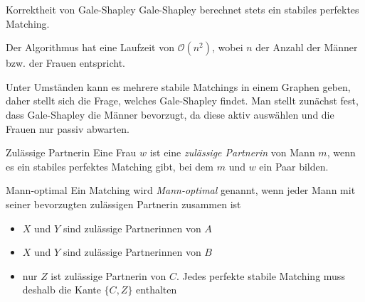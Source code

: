 \documentclass{panikzettel}
\begin{document}
\begin{theo}{Korrektheit von Gale-Shapley}
	Gale-Shapley berechnet stets ein stabiles perfektes Matching. 
	
	Der Algorithmus hat eine Laufzeit von $\mathcal{O}(n^2)$, wobei $n$ der Anzahl der Männer bzw. der Frauen entspricht.
\end{theo}

Unter Umständen kann es mehrere stabile Matchings in einem Graphen geben, daher stellt sich die Frage, welches Gale-Shapley findet. Man stellt zunächst fest, dass Gale-Shapley die Männer bevorzugt, da diese aktiv auswählen und die Frauen nur passiv abwarten. 

\begin{thirdboxl}
	\vspace{-\baselineskip}	
	\begin{defi}{Zulässige Partnerin}
		Eine Frau $w$ ist eine \emph{zulässige Partnerin} von Mann $m$, wenn es ein stabiles perfektes Matching gibt, bei dem $m$ und $w$ ein Paar bilden.
	\end{defi}

	\begin{defi}{Mann-optimal}
		Ein Matching wird \emph{Mann-optimal} genannt, wenn jeder Mann mit seiner bevorzugten zulässigen Partnerin zusammen ist
	\end{defi}
\end{thirdboxl}%
\begin{thirdboxm}
	\vspace{0.7cm}	
	\begin{center}
	\end{center}
\end{thirdboxm}%
\begin{thirdboxr}
	\vspace{1.5cm}	
	\begin{itemize}
		\item $X$ und $Y$ sind zulässige Partnerinnen von $A$
		\item $X$ und $Y$ sind zulässige Partnerinnen von $B$
		\item nur $Z$ ist zulässige Partnerin von $C$. Jedes perfekte stabile Matching muss deshalb die Kante $\{C,Z\}$ enthalten
	\end{itemize}
\end{thirdboxr}
\end{document}
